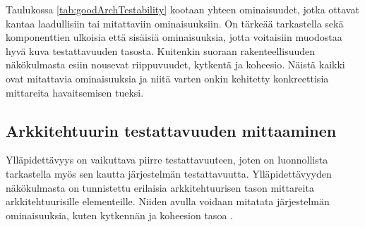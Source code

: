 \documentclass[finnish]{tktltiki2}
\numberwithin{table}{section}
\theoremstyle{definition}
\theoremstyle{remark}
\begin{document}


\begin{table}[H]
	\centering
	\setlength{\extrarowheight}{10pt}%
	\caption{Hyvään testattavuuteen vaikuttavat ominaisuudet jaoteltuna kahteen eri luokaan: laadulliset ja metriset.}
	\label{tab:goodArchTestability}
\end{table}

\noindent
Taulukossa \ref{tab:goodArchTestability} kootaan yhteen ominaisuudet, jotka ottavat kantaa laadullisiin tai mitattaviin ominaisuuksiin. On tärkeää tarkastella sekä komponenttien ulkoisia että sisäisiä ominaisuuksia, jotta voitaisiin muodostaa hyvä kuva testattavuuden tasosta. Kuitenkin suoraan rakenteellisuuden näkökulmasta esiin nousevat riippuvuudet, kytkentä ja koheesio. Näistä kaikki ovat mitattavia ominaisuuksia ja niitä varten onkin kehitetty konkreettisia mittareita havaitsemisen tueksi.  


\subsection{Arkkitehtuurin testattavuuden mittaaminen} \label{arch_testability_measurement}

Ylläpidettävyys on vaikuttava piirre testattavuuteen, joten on luonnollista tarkastella myös sen kautta järjestelmän testattavuutta. Ylläpidettävyyden näkökulmasta on tunnistettu erilaisia arkkitehtuurisen tason mittareita arkkitehtuurisille elementeille. Niiden avulla voidaan mitatata järjestelmän ominaisuuksia, kuten kytkennän ja koheesion tasoa \citep{bengtsson1998towards}.

\iffalse


\begin{itemize}
	\item metodien määrä elementin rajapinnassa
	\item paikkamerkkien (placeholder) määrä arkkitehtuurisille elementeille, joiden avulla elementti parametrisoidaan
	\item elementistä lähtevien viestien määrä
	\item elementtityyppien määrä, joita tarkasteltava elementti toteuttaa (implement)
	\item elementtien määrä, jotka toteuttavat tarkasteltavan elementin tyypin
	\item saatavilla olevien metodien lukumäärä muista elementeistä, jotka ovat yhteydessä tarkasteltavaan elementtiin
	\item elementin metodien ja parametrien määrä
\end{itemize}
\fi
\end{document}
